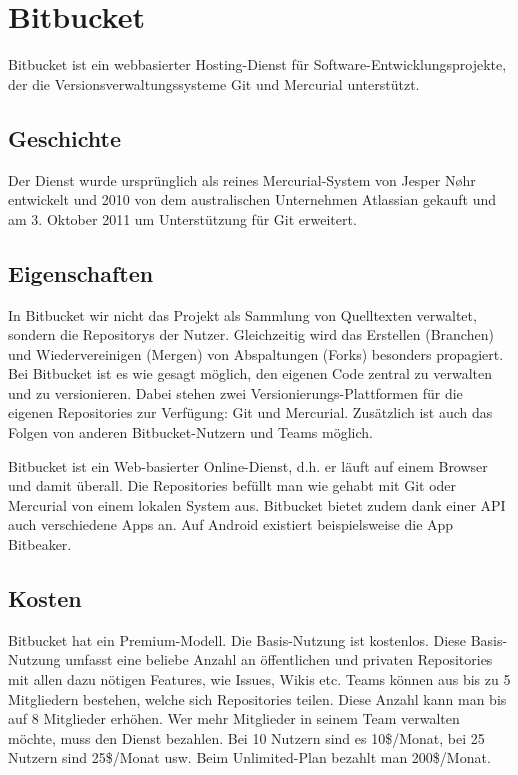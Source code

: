 \section{Bitbucket}
    
	Bitbucket ist ein webbasierter Hosting-Dienst für Software-Entwicklungsprojekte, der die Versionsverwaltungssysteme Git und Mercurial unterstützt.
    
	\subsection{Geschichte}

		Der Dienst wurde ursprünglich als reines Mercurial-System von Jesper Nøhr entwickelt und 2010 von dem australischen Unternehmen Atlassian gekauft und am 3. Oktober 2011 um Unterstützung für Git erweitert.
    
	\subsection{Eigenschaften}
    
		In Bitbucket wir nicht das Projekt als Sammlung von Quelltexten verwaltet, sondern die Repositorys der Nutzer. Gleichzeitig wird das Erstellen (Branchen) und Wiedervereinigen (Mergen) von Abspaltungen (Forks) besonders propagiert. Bei Bitbucket ist es wie gesagt möglich, den eigenen Code zentral zu verwalten und zu versionieren. Dabei stehen zwei Versionierungs-Plattformen für die eigenen Repositories zur Verfügung: Git und Mercurial. Zusätzlich ist auch das Folgen von anderen Bitbucket-Nutzern und Teams möglich.

Bitbucket ist ein Web-basierter Online-Dienst, d.h. er läuft auf einem Browser und damit überall. Die Repositories befüllt man wie gehabt mit Git oder Mercurial von einem lokalen System aus. Bitbucket bietet zudem dank einer API auch verschiedene Apps an. Auf Android existiert beispielsweise die App Bitbeaker.

	\subsection{Kosten}

		Bitbucket hat ein Premium-Modell. Die Basis-Nutzung ist kostenlos. Diese Basis-Nutzung umfasst eine beliebe Anzahl an öffentlichen und privaten Repositories mit allen dazu nötigen Features, wie Issues, Wikis etc. Teams können aus bis zu 5 Mitgliedern bestehen, welche sich Repositories teilen. Diese Anzahl kann man bis auf 8 Mitglieder erhöhen. Wer mehr Mitglieder in seinem Team verwalten möchte, muss den Dienst bezahlen. Bei 10 Nutzern sind es 10\$/Monat, bei 25 Nutzern sind 25\$/Monat usw. Beim Unlimited-Plan bezahlt man 200\$/Monat.
